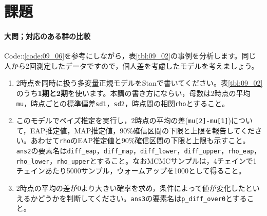 \documentclass{ltjsbook}
\begin{document}
\section{課題}


\paragraph{大問；対応のある群の比較}
Code::\ref{code:09_06}を参考にしながら，表\ref{tbl:09_02}の事例を分析します。同じ人から2回測定したデータですので，個人差を考慮したモデルを考えましょう。
\begin{enumerate}
	\item 2時点を同時に扱う多変量正規モデルをStanで書いてください。表\ref{tbl:09_02}のうち\textbf{1期と2期}を使います。本講の書き方にならい，母数は2時点の平均\verb|mu|，時点ごとの標準偏差\verb|sd1|，\verb|sd2|，時点間の相関\verb|rho|とすること。
	\item このモデルでベイズ推定を実行し，2時点の平均の差(\verb|mu[2]-mu[1]|)について，EAP推定値，MAP推定値，90\%確信区間の下限と上限を報告してください。あわせて\verb|rho|のEAP推定値と90\%確信区間の下限と上限も示すこと。\verb|ans2|の要素名は\verb|diff_eap|，\verb|diff_map|，\verb|diff_lower|，\verb|diff_upper|，\verb|rho_eap|，\verb|rho_lower|，\verb|rho_upper|とすること。なおMCMCサンプルは，4チェインで1チェインあたり5000サンプル，ウォームアップを1000として得ること。
	\item 2時点の平均の差が0より大きい確率を求め，条件によって値が変化したといえるかどうかを判断してください。\verb|ans3|の要素名は\verb|p_diff_over0|とすること。
\end{enumerate}
\end{document}
